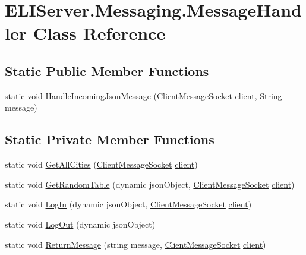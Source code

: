 \hypertarget{class_e_l_i_server_1_1_messaging_1_1_message_handler}{}\section{E\+L\+I\+Server.\+Messaging.\+Message\+Handler Class Reference}
\label{class_e_l_i_server_1_1_messaging_1_1_message_handler}
\subsection*{Static Public Member Functions}
\begin{DoxyCompactItemize}
\item 
static void \hyperlink{class_e_l_i_server_1_1_messaging_1_1_message_handler_a54b8fc68511fe197932338c0ffdb75c0}{Handle\+Incoming\+Json\+Message} (\hyperlink{class_e_l_i_server_1_1_messaging_1_1_client_message_socket}{Client\+Message\+Socket} \hyperlink{class_e_l_i_server_1_1_messaging_1_1_message_handler_a0373b287a964b75f145c12031d28accd}{client}, String message)
\end{DoxyCompactItemize}
\subsection*{Static Private Member Functions}
\begin{DoxyCompactItemize}
\item 
static void \hyperlink{class_e_l_i_server_1_1_messaging_1_1_message_handler_a3dd06c4f9c959db12a96af3397114861}{Get\+All\+Cities} (\hyperlink{class_e_l_i_server_1_1_messaging_1_1_client_message_socket}{Client\+Message\+Socket} \hyperlink{class_e_l_i_server_1_1_messaging_1_1_message_handler_a0373b287a964b75f145c12031d28accd}{client})
\item 
static void \hyperlink{class_e_l_i_server_1_1_messaging_1_1_message_handler_a2e0ec94ce30e0f2ebf9ed02393fb35e1}{Get\+Random\+Table} (dynamic json\+Object, \hyperlink{class_e_l_i_server_1_1_messaging_1_1_client_message_socket}{Client\+Message\+Socket} \hyperlink{class_e_l_i_server_1_1_messaging_1_1_message_handler_a0373b287a964b75f145c12031d28accd}{client})
\item 
static void \hyperlink{class_e_l_i_server_1_1_messaging_1_1_message_handler_ac7d3cf8905a2ddb6ff26f092c92fa886}{Log\+In} (dynamic json\+Object, \hyperlink{class_e_l_i_server_1_1_messaging_1_1_client_message_socket}{Client\+Message\+Socket} \hyperlink{class_e_l_i_server_1_1_messaging_1_1_message_handler_a0373b287a964b75f145c12031d28accd}{client})
\item 
static void \hyperlink{class_e_l_i_server_1_1_messaging_1_1_message_handler_a1fe43aa94ee3e3d03fcf147549eabced}{Log\+Out} (dynamic json\+Object)
\item 
static void \hyperlink{class_e_l_i_server_1_1_messaging_1_1_message_handler_a5340630c241299aa12547888d42edd03}{Return\+Message} (string message, \hyperlink{class_e_l_i_server_1_1_messaging_1_1_client_message_socket}{Client\+Message\+Socket} \hyperlink{class_e_l_i_server_1_1_messaging_1_1_message_handler_a0373b287a964b75f145c12031d28accd}{client})
\end{DoxyCompactItemize}
